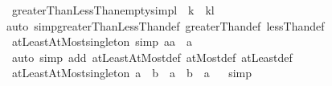 \begin{isabellebody}
\endisatagproof
{\isafoldproof}%
%
\isadelimproof
\isanewline
%
\endisadelimproof
\isanewline
{}\isamarkupfalse%
\ greaterThanLessThan{\isacharunderscore}{\kern0pt}empty{\isacharbrackleft}{\kern0pt}simp{\isacharbrackright}{\kern0pt}{\isacharcolon}{\kern0pt}{\isachardoublequoteopen}l\ {\isasymle}\ k\ {\isacharequal}{\kern0pt}{\isacharequal}{\kern0pt}{\isachargreater}{\kern0pt}\ {\isacharbraceleft}{\kern0pt}k{\isacharless}{\kern0pt}{\isachardot}{\kern0pt}{\isachardot}{\kern0pt}{\isacharless}{\kern0pt}l{\isacharbraceright}{\kern0pt}\ {\isacharequal}{\kern0pt}\ {\isacharbraceleft}{\kern0pt}{\isacharbraceright}{\kern0pt}{\isachardoublequoteclose}\isanewline
%
\isadelimproof
\ \ %
\endisadelimproof
%
\isatagproof
{}\isamarkupfalse%
{\isacharparenleft}{\kern0pt}auto\ simp{\isacharcolon}{\kern0pt}greaterThanLessThan{\isacharunderscore}{\kern0pt}def\ greaterThan{\isacharunderscore}{\kern0pt}def\ lessThan{\isacharunderscore}{\kern0pt}def{\isacharparenright}{\kern0pt}%
\endisatagproof
{\isafoldproof}%
%
\isadelimproof
\isanewline
%
\endisadelimproof
\isanewline
{}\isamarkupfalse%
\ atLeastAtMost{\isacharunderscore}{\kern0pt}singleton\ {\isacharbrackleft}{\kern0pt}simp{\isacharbrackright}{\kern0pt}{\isacharcolon}{\kern0pt}\ {\isachardoublequoteopen}{\isacharbraceleft}{\kern0pt}a{\isachardot}{\kern0pt}{\isachardot}{\kern0pt}a{\isacharbraceright}{\kern0pt}\ {\isacharequal}{\kern0pt}\ {\isacharbraceleft}{\kern0pt}a{\isacharbraceright}{\kern0pt}{\isachardoublequoteclose}\isanewline
%
\isadelimproof
\ \ %
\endisadelimproof
%
\isatagproof
{}\isamarkupfalse%
\ {\isacharparenleft}{\kern0pt}auto\ simp\ add{\isacharcolon}{\kern0pt}\ atLeastAtMost{\isacharunderscore}{\kern0pt}def\ atMost{\isacharunderscore}{\kern0pt}def\ atLeast{\isacharunderscore}{\kern0pt}def{\isacharparenright}{\kern0pt}%
\endisatagproof
{\isafoldproof}%
%
\isadelimproof
\isanewline
%
\endisadelimproof
\isanewline
{}\isamarkupfalse%
\ atLeastAtMost{\isacharunderscore}{\kern0pt}singleton{\isacharprime}{\kern0pt}{\isacharcolon}{\kern0pt}\ {\isachardoublequoteopen}a\ {\isacharequal}{\kern0pt}\ b\ {\isasymLongrightarrow}\ {\isacharbraceleft}{\kern0pt}a\ {\isachardot}{\kern0pt}{\isachardot}{\kern0pt}\ b{\isacharbraceright}{\kern0pt}\ {\isacharequal}{\kern0pt}\ {\isacharbraceleft}{\kern0pt}a{\isacharbraceright}{\kern0pt}{\isachardoublequoteclose}%
\isadelimproof
\ %
\endisadelimproof
%
\isatagproof
{}\isamarkupfalse%
\ simp%
\endisatagproof
{\isafoldproof}%
%
\isadelimproof
%
\endisadelimproof
\isanewline
\isanewline
{}\isamarkupfalse%

\end{isabellebody}

